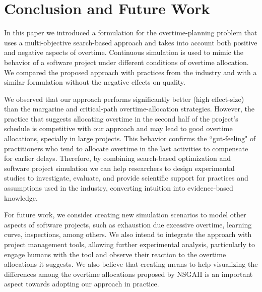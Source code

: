 \documentclass[conference]{IEEEtran}
\begin{document}
\section{Conclusion and Future Work}

In this paper we introduced a formulation for the overtime-planning problem that uses a multi-objective search-based approach and takes into account both positive and negative aspects of overtime. Continuous simulation is used to mimic the behavior of a software project under different conditions of overtime allocation. We compared the proposed approach with practices from the industry and with a similar formulation without the negative effects on quality. 

We observed that our approach performs significantly better (high effect-size) than the margarine and critical-path overtime-allocation strategies. However, the practice that suggests allocating overtime in the second half of the project's schedule is competitive with our approach and may lead to good overtime allocations, specially in large projects. This behavior confirms the ``gut-feeling" of practitioners who tend to allocate overtime in the last activities to compensate for earlier delays. Therefore, by combining search-based optimization and software project simulation we can help researchers to design experimental studies to investigate, evaluate, and provide scientific support for practices and assumptions used in the industry, converting intuition into evidence-based knowledge. 

For future work, we consider creating new simulation scenarios to model other aspects of software projects, such as exhaustion due excessive overtime, learning curve, inspections, among others. We also intend to integrate the approach with project management tools, allowing further experimental analysis, particularly to engage humans with the tool and observe their reaction to the overtime allocations it suggests. We also believe that creating means to help visualizing the differences among the overtime allocations proposed by NSGAII is an important aspect towards adopting our approach in practice.




\end{document}
